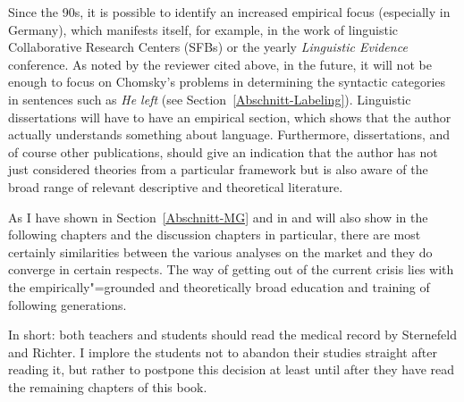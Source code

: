 Since the 90s, it is possible to identify an increased empirical focus (especially in Germany),
which manifests itself, for example, in the work of linguistic Collaborative Research Centers (SFBs)
or the yearly \emph{Linguistic Evidence} conference. As noted by the reviewer cited above, in the
future, it will not be enough to focus on Chomsky's problems in determining the syntactic categories
in sentences such as \emph{He left} (see
Section~\ref{Abschnitt-Labeling}). Linguistic dissertations will have to have an empirical section, which shows that the author actually understands
something about language. Furthermore, dissertations, and of course other publications, should give an indication that the author has not just
considered theories from a particular framework but is also aware of the broad range of relevant descriptive and theoretical literature.

As I have shown in Section~\ref{Abschnitt-MG} and in  and will also show in
the following chapters and the discussion chapters in particular, there are most certainly similarities between the various analyses on the market 
and they do converge in certain respects. The way of getting out of the current crisis lies with the
empirically"=grounded and theoretically broad education and training of following generations.

In short: both teachers and students should read the medical record by Sternefeld and Richter. I implore the students not to abandon their studies straight
after reading it, but rather to postpone this decision at least until after they have read the remaining chapters of this book.


